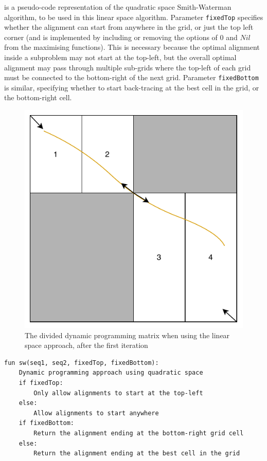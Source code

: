  is a pseudo-code representation of the quadratic space Smith-Waterman algorithm, to be used in this linear space algorithm.
Parameter \lstinline{fixedTop} specifies whether the alignment can start from anywhere in the grid, or just the top left corner (and is implemented by including or removing the options of $0$ and $Nil$ from the maximising functions).
This is necessary because the optimal alignment inside a subproblem may not start at the top-left, but the overall optimal alignment may pass through multiple sub-grids where the top-left of each grid must be connected to the bottom-right of the next grid.
Parameter \lstinline{fixedBottom} is similar, specifying whether to start back-tracing at the best cell in the grid, or the bottom-right cell.

\begin{figure}
    \centering
    \includegraphics[width=(0.4\textwidth)]{figs/linear_space_structure.pdf}
    \caption{The divided dynamic programming matrix when using the linear space approach, after the first iteration}
    \label{fig:Linear_Space_Structure}
\end{figure}

\begin{lstlisting}[basicstyle=\linespread{0.9}\ttfamily\footnotesize, label={lst:pseudo_sw},captionpos=b,caption={Pseudo-code representation of quadratic space implementation of SW algorithm}]
fun sw(seq1, seq2, fixedTop, fixedBottom):
    Dynamic programming approach using quadratic space
    if fixedTop:
        Only allow alignments to start at the top-left
    else:
        Allow alignments to start anywhere
    if fixedBottom:
        Return the alignment ending at the bottom-right grid cell
    else:
        Return the alignment ending at the best cell in the grid
\end{lstlisting}


